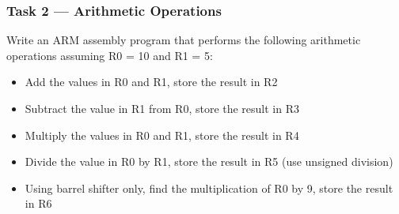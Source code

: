 \subsubsection{Task 2 --- Arithmetic Operations}
Write an ARM assembly program that performs the following arithmetic operations assuming R0 = 10 and R1 = 5:
\begin{itemize}[nosep]
    \item Add the values in R0 and R1, store the result in R2
    \item Subtract the value in R1 from R0, store the result in R3
    \item Multiply the values in R0 and R1, store the result in R4
    \item Divide the value in R0 by R1, store the result in R5 (use unsigned division)
    \item Using barrel shifter only, find the multiplication of R0 by 9, store the result in R6
\end{itemize}

